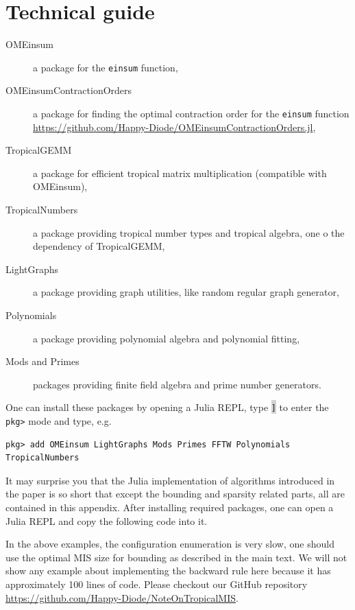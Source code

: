 \documentclass[onefignum, onetabnum]{siamart190516}
\newcommand{\<}{\langle}
\renewcommand{\>}{\rangle}
\newcounter{example}
\begin{document}



\appendix

\section{Technical guide}\label{sec:technical}
\begin{description}
	\item[OMEinsum] a package for the \texttt{einsum} function,
	\item[OMEinsumContractionOrders] a package for finding the optimal contraction order for the \texttt{einsum} function \\ \href{https://github.com/Happy-Diode/OMEinsumContractionOrders.jl}{https://github.com/Happy-Diode/OMEinsumContractionOrders.jl},
	\item[TropicalGEMM] a package for efficient tropical matrix multiplication (compatible with OMEinsum),
	\item[TropicalNumbers] a package providing tropical number types and tropical algebra, one o the dependency of TropicalGEMM,
	\item[LightGraphs] a package providing graph utilities, like random regular graph generator,
	\item[Polynomials] a package providing polynomial algebra and polynomial fitting,
	\item[Mods and Primes] packages providing finite field algebra and prime number generators.
\end{description}

One can install these packages by opening a Julia REPL, type \colorbox{lightgray}{\texttt{]}} to enter the \texttt{pkg>} mode and type, e.g.
\begin{lstlisting}
pkg> add OMEinsum LightGraphs Mods Primes FFTW Polynomials TropicalNumbers
\end{lstlisting}

It may surprise you that the Julia implementation of algorithms introduced in the paper is so short that except the bounding and sparsity related parts,
all are contained in this appendix. After installing required packages, one can open a Julia REPL and copy the following code into it.



In the above examples, the configuration enumeration is very slow, one should use the optimal MIS size for bounding as described in the main text.
We will not show any example about implementing the backward rule here because it has approximately 100 lines of code.
Please checkout our GitHub repository \href{https://github.com/Happy-Diode/NoteOnTropicalMIS}{https://github.com/Happy-Diode/NoteOnTropicalMIS}.
\end{document}
